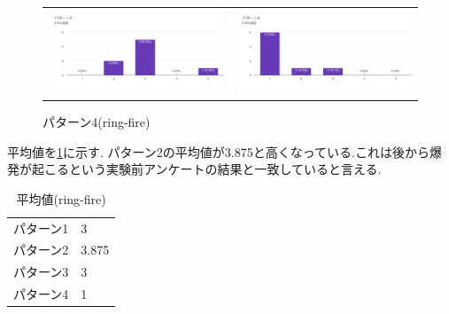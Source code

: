 \begin{figure}[h]
\begin{tabular}{cc}
      \begin{minipage}[t]{0.45\hsize}
        \centering
        \includegraphics[keepaspectratio, scale=0.5]{fig/ringfire3.png}
        \caption{パターン3(ring-fire)}
        \label{fill}
      \end{minipage} &
      \begin{minipage}[t]{0.45\hsize}
        \centering
        \includegraphics[keepaspectratio, scale=0.5]{fig/ringfire4.png}
        \caption{パターン4(ring-fire)}
        \label{transform}
      \end{minipage} 
    \end{tabular}
  \end{figure}

平均値を\ref{tab;ringAve}に示す.
パターン2の平均値が3.875と高くなっている.これは後から爆発が起こるという実験前アンケートの結果と一致していると言える.

\begin{table}[H]
    \caption{\label{tab;ringAve}平均値(ring-fire)}
    \centering
    \begin{tabular}{l|l}
    \hline
    \hline
    パターン1 & 3\\
    パターン2 & 3.875\\
    パターン3 & 3\\
    パターン4 & 1\\
    \hline
    \end{tabular}
\end{table}

